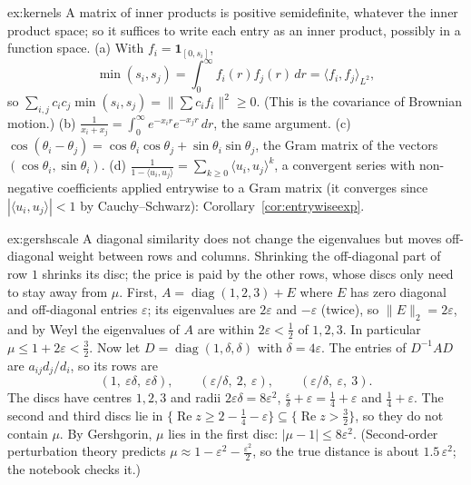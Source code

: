 \begin{solution}{ex:kernels}
\idea A matrix of inner products is positive semidefinite, whatever the inner product space; so it suffices to write each entry as
an inner product, possibly in a function space.
\writeup (a) With $f_i=\mathbf 1_{[0,s_i]}$,
\[
\min(s_i,s_j)=\int_0^\infty f_i(r)f_j(r)\,dr=\langle f_i,f_j\rangle_{L^2},
\]
so $\sum_{i,j}c_ic_j
\min(s_i,s_j)=\|\sum c_if_i\|^2\ge0$. (This is the covariance of Brownian motion.) (b) $\frac1{x_i+x_j}=\int_0^\infty e^{-x_ir}e^{-x_jr}\,dr$, the
same argument. (c) $\cos(\theta_i-\theta_j)=\cos\theta_i\cos\theta_j+\sin\theta_i\sin\theta_j$, the Gram matrix of the vectors
$(\cos\theta_i,\sin\theta_i)$. (d) $\frac1{1-\langle u_i,u_j\rangle}=\sum_{k\ge0}\langle u_i,u_j\rangle^k$, a convergent series with non-negative
coefficients applied entrywise to a Gram matrix (it converges since $|\langle u_i,u_j\rangle|<1$ by Cauchy--Schwarz):
Corollary~\ref{cor:entrywiseexp}.
\end{solution}

\begin{solution}{ex:gershscale}
\idea A diagonal similarity does not change the eigenvalues but moves off-diagonal weight between rows and columns. Shrinking
the off-diagonal part of row $1$ shrinks its disc; the price is paid by the other rows, whose discs only need to stay away from $\mu$.
\writeup First, $A=\operatorname{diag}(1,2,3)+E$ where $E$ has zero diagonal and off-diagonal entries $\varepsilon$; its eigenvalues are $2\varepsilon$
and $-\varepsilon$ (twice), so $\|E\|_2=2\varepsilon$, and by Weyl the eigenvalues of $A$ are within $2\varepsilon<\frac12$ of $1,2,3$. In
particular $\mu\le1+2\varepsilon<\frac32$. Now let $D=\operatorname{diag}(1,\delta,\delta)$ with $\delta=4\varepsilon$. The entries of
$D^{-1}AD$ are $a_{ij}d_j/d_i$, so its rows are
\[
(1,\ \varepsilon\delta,\ \varepsilon\delta),\qquad(\varepsilon/\delta,\ 2,\ \varepsilon),\qquad(\varepsilon/\delta,\ \varepsilon,\ 3).
\]
The discs have centres $1,2,3$ and radii $2\varepsilon\delta=8\varepsilon^2$, $\frac\varepsilon\delta+\varepsilon=\frac14+\varepsilon$ and
$\frac14+\varepsilon$. The second and third discs lie in $\{\operatorname{Re}z\ge2-\frac14-\varepsilon\}\subseteq\{\operatorname{Re}z>\frac32\}$,
so they do not contain $\mu$. By Gershgorin, $\mu$ lies in the first disc: $|\mu-1|\le8\varepsilon^2$. (Second-order perturbation theory
predicts $\mu\approx1-\varepsilon^2-\frac{\varepsilon^2}2$, so the true distance is about $1.5\,\varepsilon^2$; the notebook checks it.)
\end{solution}


